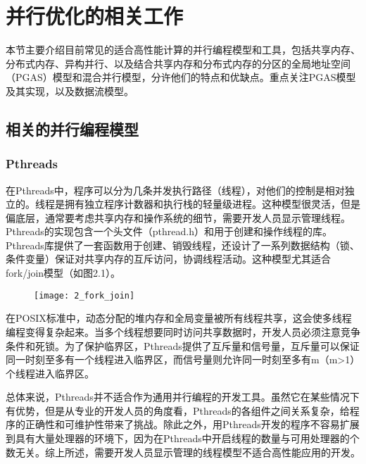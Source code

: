 
\chapter{并行优化的相关工作}
\label{chap:related2}

本节主要介绍目前常见的适合高性能计算的并行编程模型和工具，包括共享内存、分布式内存、异构并行、以及结合共享内存和分布式内存的分区的全局地址空间（PGAS）模型和混合并行模型，分许他们的特点和优缺点。重点关注PGAS模型及其实现，以及数据流模型。

\section{相关的并行编程模型}

\subsection{Pthreads}

在Pthreads中，程序可以分为几条并发执行路径（线程），对他们的控制是相对独立的。线程是拥有独立程序计数器和执行栈的轻量级进程\citep{andrews2000foundations}。这种模型很灵活，但是偏底层，通常要考虑共享内存和操作系统的细节，需要开发人员显示管理线程。Pthreads的实现包含一个头文件（pthread.h）和用于创建和操作线程的库。Pthreads库提供了一套函数用于创建、销毁线程，还设计了一系列数据结构（锁、条件变量）保证对共享内存的互斥访问，协调线程活动。这种模型尤其适合fork/join模型\citep{mattson2004patterns}（如图2.1）。

\begin{figure}[!htbp]
    \centering
    \texttt{[image: 2\_fork\_join]}
    \label{fig:2_fork_join}
\end{figure}

在POSIX标准中，动态分配的堆内存和全局变量被所有线程共享，这会使多线程编程变得复杂起来。当多个线程想要同时访问共享数据时，开发人员必须注意竞争条件和死锁。为了保护临界区，Pthreads提供了互斥量和信号量\citep{grama2003introduction}，互斥量可以保证同一时刻至多有一个线程进入临界区，而信号量则允许同一时刻至多有m（m>1）个线程进入临界区。

总体来说，Pthreads并不适合作为通用并行编程的开发工具。虽然它在某些情况下有优势，但是从专业的开发人员的角度看，Pthreads的各组件之间关系复杂，给程序的正确性和可维护性带来了挑战。除此之外，用Pthreads开发的程序不容易扩展到具有大量处理器的环境下\citep{dongarra2003sourcebook}，因为在Pthreads中开启线程的数量与可用处理器的个数无关。综上所述，需要开发人员显示管理的线程模型不适合高性能应用的开发。

